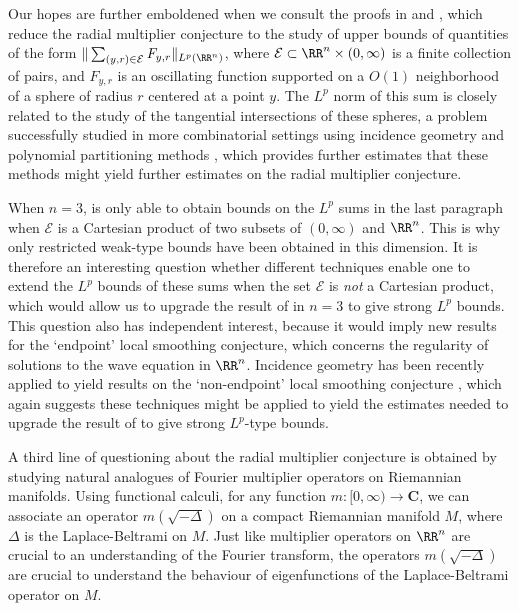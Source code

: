 Our hopes are further emboldened when we consult the proofs in \cite{HeoandNazarovandSeeger} and \cite{Cladek}, which reduce the radial multiplier conjecture to the study of upper bounds of quantities of the form $\| \sum_{(y,r) \in \mathcal{E}} F_{y,r} \|_{L^p(\RR^n)}$, where $\mathcal{E} \subset \RR^n \times (0,\infty)$ is a finite collection of pairs, and $F_{y,r}$ is an oscillating function supported on a $O(1)$ neighborhood of a sphere of radius $r$ centered at a point $y$. The $L^p$ norm of this sum is closely related to the study of the tangential intersections of these spheres, a problem successfully studied in more combinatorial settings using incidence geometry and polynomial partitioning methods \cite{Zahl}, which provides further estimates that these methods might yield further estimates on the radial multiplier conjecture.

When $n = 3$, \cite{Cladek} is only able to obtain bounds on the $L^p$ sums in the last paragraph when $\mathcal{E}$ is a Cartesian product of two subsets of $(0,\infty)$ and $\RR^n$. This is why only restricted weak-type bounds have been obtained in this dimension. It is therefore an interesting question whether different techniques enable one to extend the $L^p$ bounds of these sums when the set $\mathcal{E}$ is \emph{not} a Cartesian product, which would allow us to upgrade the result of \cite{Cladek} in $n = 3$ to give strong $L^p$ bounds. This question also has independent interest, because it would imply new results for the `endpoint' local smoothing conjecture, which concerns the regularity of solutions to the wave equation in $\RR^n$. Incidence geometry has been recently applied to yield results on the `non-endpoint' local smoothing conjecture \cite{GuthandWangandZhang}, which again suggests these techniques might be applied to yield the estimates needed to upgrade the result of \cite{Cladek} to give strong $L^p$-type bounds.

A third line of questioning about the radial multiplier conjecture is obtained by studying natural analogues of Fourier multiplier operators on Riemannian manifolds. Using functional calculi, for any function $m: [0,\infty) \to \mathbf{C}$, we can associate an operator $m(\sqrt{-\Delta})$ on a compact Riemannian manifold $M$, where $\Delta$ is the Laplace-Beltrami on $M$. Just like multiplier operators on $\RR^n$ are crucial to an understanding of the Fourier transform, the operators $m(\sqrt{-\Delta})$ are crucial to understand the behaviour of eigenfunctions of the Laplace-Beltrami operator on $M$.

